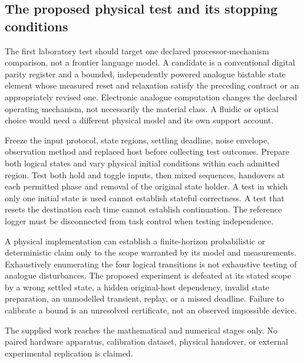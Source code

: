 \subsection{The proposed physical test and its stopping conditions}\label{subsec:physicaltest}
The first laboratory test should target one declared processor-mechanism comparison, not a frontier language model. A candidate is a conventional digital parity register and a bounded, independently powered analogue bistable state element whose measured reset and relaxation satisfy the preceding contract or an appropriately revised one. Electronic analogue computation changes the declared operating mechanism, not necessarily the material class. A fluidic or optical choice would need a different physical model and its own support account.

Freeze the input protocol, state regions, settling deadline, noise envelope, observation method and replaced host before collecting test outcomes. Prepare both logical states and vary physical initial conditions within each admitted region. Test both hold and toggle inputs, then mixed sequences, handovers at each permitted phase and removal of the original state holder. A test in which only one initial state is used cannot establish stateful correctness. A test that resets the destination each time cannot establish continuation. The reference logger must be disconnected from task control when testing independence.

A physical implementation can establish a finite-horizon probabilistic or deterministic claim only to the scope warranted by its model and measurements. Exhaustively enumerating the four logical transitions is not exhaustive testing of analogue disturbances. The proposed experiment is defeated at its stated scope by a wrong settled state, a hidden original-host dependency, invalid state preparation, an unmodelled transient, replay, or a missed deadline. Failure to calibrate a bound is an unresolved certificate, not an observed impossible device.

The supplied work reaches the mathematical and numerical stages only. No paired hardware apparatus, calibration dataset, physical handover, or external experimental replication is claimed.
